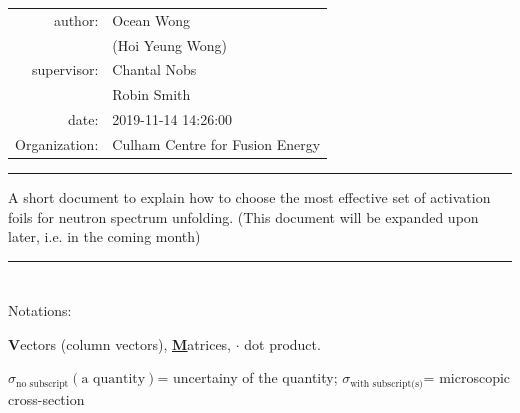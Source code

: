 \documentclass[a4paper, 12pt]{article}
\newcommand{\matr}[1]{\underline{\underline{\textbf{#1}}}}
\newcommand{\ve}[1]{\boldsymbol{#1}}
\begin{document}
    
\centering
    
\begin{table}[!h]
\centering
\begin{tabular}{rl}
author:&Ocean Wong          \\
       &(Hoi Yeung Wong)    \\
supervisor:&Chantal Nobs    \\
           &Robin Smith     \\
date:  &2019-11-14 14:26:00 \\
Organization:  &Culham Centre for Fusion Energy
\end{tabular}
\end{table}
\hrule
\bigbreak
\abstract
A short document to explain how to choose the most effective set of activation foils for neutron spectrum unfolding.
(This document will be expanded upon later, i.e. in the coming month)    
\hrule
\vspace{1cm}
\chapter{}
Notations:

$\ve{V}$ectors (column vectors), \matr{M}atrices, $\cdot$ dot product.

$\sigma_{\text{no subscript}}(\text{a quantity})$= uncertainy of the quantity; $\sigma_{\text{with subscript(s)}}$= microscopic cross-section

\end{document}
